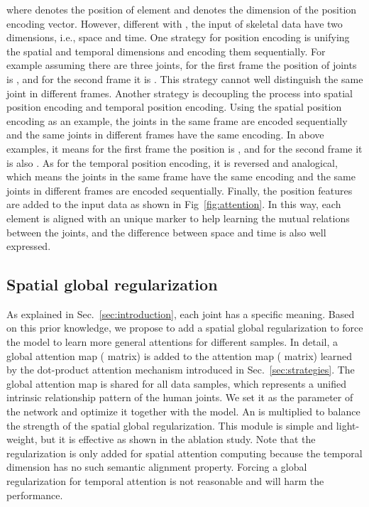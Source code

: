 \documentclass[runningheads]{llncs}
\begin{document}
where  denotes the position of element and  denotes the dimension of the position encoding vector.
However, different with \cite{vaswani_attention_2017}, the input of skeletal data have two dimensions, i.e., space and time. 
One strategy for position encoding is unifying the spatial and temporal dimensions and encoding them sequentially. 
For example assuming there are three joints, for the first frame the position of joints is , and for the second frame it is . 
This strategy cannot well distinguish  the same joint in different frames. 
Another strategy is decoupling the process into spatial position encoding and temporal position encoding. 
Using the spatial position encoding as an example, the joints in the same frame are encoded sequentially and the same joints in different frames have the same encoding. 
In above examples, it means for the first frame the position is , and for the second frame it is also . 
As for the temporal position encoding, it is reversed and analogical, which means the joints in the same frame have the same encoding and the same joints in different frames are encoded sequentially. 
Finally, the position features are added to the input data as shown in Fig~\ref{fig:attention}. 
In this way, each element is aligned with an unique marker to help learning the mutual relations between the joints, and the difference between space and time is also well expressed. 

\subsection{Spatial global regularization}
\label{sec:regularization}


As explained in Sec.~\ref{sec:introduction}, each joint has a specific meaning. 
Based on this prior knowledge, we propose to add a spatial global regularization to force the model to learn more general attentions for different samples.
In detail, a global attention map ( matrix) is added to the attention map ( matrix) learned by the dot-product attention mechanism introduced in Sec.~\ref{sec:strategies}. 
The global attention map is shared for all data samples, which represents a unified intrinsic relationship pattern of the human joints. 
We set it as the parameter of the network and optimize it together with the model. 
An  is multiplied to balance the strength of the spatial global regularization. 
This module is simple and light-weight, but it is effective as shown in the ablation study. 
Note that the regularization is only added for spatial attention computing because the temporal dimension has no such semantic alignment property. 
Forcing a global regularization for temporal attention is not reasonable and will harm the performance. 
\end{document}
